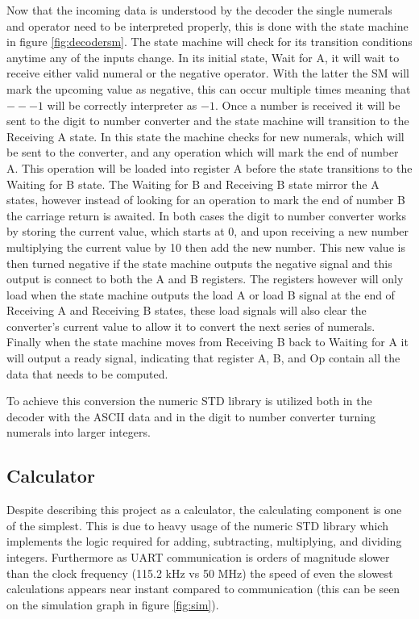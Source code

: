 \documentclass[11pt]{article}
\begin{document}
Now that the incoming data is understood by the decoder the single numerals and operator need to be interpreted properly, this is done with the state machine in figure \ref{fig:decodersm}.
The state machine will check for its transition conditions anytime any of the inputs change. 
In its initial state, Wait for A, it will wait to receive either valid numeral or the negative operator. 
With the latter the SM will mark the upcoming value as negative, this can occur multiple times meaning that $---1$ will be correctly interpreter as $-1$.
Once a number is received it will be sent to the digit to number converter and the state machine will transition to the Receiving A state. 
In this state the machine checks for new numerals, which will be sent to the converter, and any operation which will mark the end of number A.
This operation will be loaded into register A before the state transitions to the Waiting for B state.
The Waiting for B and Receiving B state mirror the A states, however instead of looking for an operation to mark the end of number B the carriage return is awaited.
In both cases the digit to number converter works by storing the current value, which starts at 0, and upon receiving a new number multiplying the current value by 10 then add the new number. 
This new value is then turned negative if the state machine outputs the negative signal and this output is connect to both the A and B registers.
The registers however will only load when the state machine outputs the load A or load B signal at the end of Receiving A and Receiving B states,
these load signals will also clear the converter's current value to allow it to convert the next series of numerals.
Finally when the state machine moves from Receiving B back to Waiting for A it will output a ready signal, indicating that register A, B, and Op contain all the data that needs to be computed.

To achieve this conversion the numeric STD library is utilized both in the decoder with the ASCII data and in the digit to number converter turning numerals into larger integers.
\subsection{Calculator}

Despite describing this project as a calculator, the calculating component is one of the simplest.
This is due to heavy usage of the numeric STD library which implements the logic required for adding, subtracting, multiplying, and dividing integers.
Furthermore as UART communication is orders of magnitude slower than the clock frequency (115.2 kHz vs 50 MHz)
the speed of even the slowest calculations appears near instant compared to communication (this can be seen on the simulation graph in figure \ref{fig:sim}).
\end{document}

